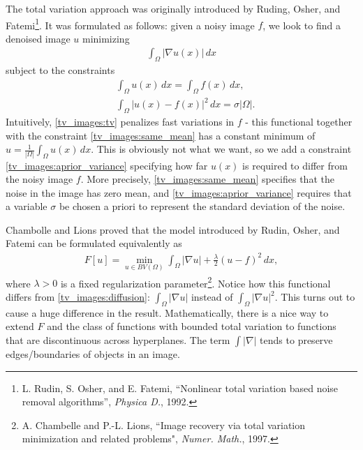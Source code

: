 The total variation approach was originally introduced by Ruding, Osher, and Fatemi\footnote{L. Rudin, S. Osher, and E. Fatemi, ``Nonlinear total variation based noise removal algorithms'', \emph{Physica D.}, 1992.}. It was formulated as follows: given a noisy image $f$, we look to find a denoised image $u$ minimizing 
\begin{align}
\int_{\Omega} |\nabla u(x)|\, dx \label{tv_images:tv}
\end{align}
subject to the constraints 
\begin{align}
	&{ } \int_{\Omega} u(x) \, dx = \int_{\Omega} f(x)\, dx, \label{tv_images:same_mean}\\
	&{ } \int_{\Omega} |u(x) - f(x)|^2\, dx = \sigma |\Omega|.\label{tv_images:aprior_variance}
\end{align}
Intuitively, \eqref{tv_images:tv} penalizes fast variations in $f$ - this functional together with the constraint \eqref{tv_images:same_mean} has a constant minimum of $u = \frac{1}{|\Omega|}\int_{\Omega} u(x) \, dx$. This is obviously not what we want, so we add a constraint \eqref{tv_images:aprior_variance} specifying how far $u(x)$ is required to differ from the noisy image $f$.  More precisely, \eqref{tv_images:same_mean} specifies that the noise in the image has zero mean, and \eqref{tv_images:aprior_variance} requires that a variable $\sigma$ be chosen a priori to represent the standard deviation of the noise. 



Chambolle and Lions proved that the model introduced by Rudin, Osher, and Fatemi can be formulated equivalently as 
\begin{align}
F[u] = \min_{u \in BV(\Omega)} \int_{\Omega} |\nabla u| + \frac{\lambda}{2}(u-f)^2 \, dx,	
\end{align}
where $\lambda >0$ is a fixed regularization parameter\footnote{A. Chambelle and P.-L. Lions, ``Image recovery via total variation minimization and related problems", \emph{Numer. Math.}, 1997.}. Notice how this functional differs from \eqref{tv_images:diffusion}: $\int_{\Omega} |\nabla u|$ instead of $\int_{\Omega} |\nabla u|^2$. This turns out to cause a huge difference in the result.  Mathematically, there is a nice way to extend $F$ and the class of functions with bounded total variation to functions that are discontinuous across hyperplanes. The term $\int |\nabla|$ tends to preserve edges/boundaries of objects in an image.


